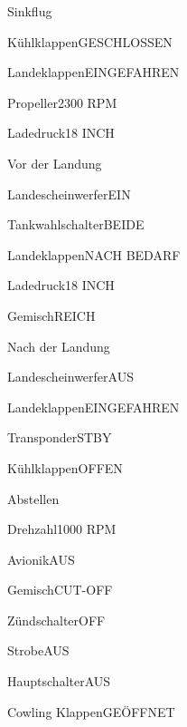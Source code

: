 \begin{task}
  \begin{checklist}{Sinkflug}
    \item{Kühlklappen}{GESCHLOSSEN}
    \item{Landeklappen}{EINGEFAHREN}
    \item{Propeller}{2300 RPM}
    \item{Ladedruck}{18 INCH}
  \end{checklist}
\end{task}

\begin{task}
  \begin{checklist}{Vor der Landung}
    \item{Landescheinwerfer}{EIN}
    \item{Tankwahlschalter}{BEIDE}
    \item{Landeklappen}{NACH BEDARF}
    \item{Ladedruck}{18 INCH}
    \item{Gemisch}{REICH}
  \end{checklist}
\end{task}

\begin{task}
  \begin{checklist}{Nach der Landung}
    \item{Landescheinwerfer}{AUS}
    \item{Landeklappen}{EINGEFAHREN}
    \item{Transponder}{STBY}
    \item{Kühlklappen}{OFFEN}
  \end{checklist}
\end{task}

\begin{task}
  \begin{checklist}{Abstellen}
    \item{Drehzahl}{1000 RPM}
    \item{Avionik}{AUS}
    \item{Gemisch}{CUT-OFF}
    \item{Zündschalter}{OFF}
    \item{Strobe}{AUS}
    \item{Hauptschalter}{AUS}
    \item{Cowling Klappen}{GEÖFFNET}
  \end{checklist}
\end{task}

